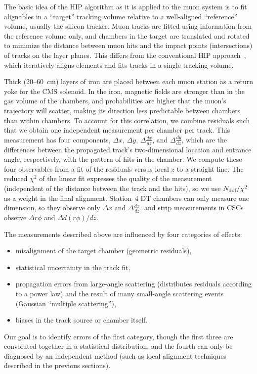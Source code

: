 The basic idea of the HIP algorithm as it is applied to the muon
system is to fit alignables in a ``target'' tracking volume relative to a
well-aligned ``reference'' volume, usually the silicon tracker.  Muon
tracks are fitted using information from the reference volume only,
and chambers in the target are translated and rotated to minimize the
distance between muon hits and the impact points (intersections) of
tracks on the layer planes.  This differs from the conventional HIP
approach~\cite{ref:oldhip}, which iteratively aligns elements and fits tracks
in a single tracking volume.

Thick (20--60~cm) layers of iron are placed between each muon station
as a return yoke for the CMS solenoid.  In the iron, magnetic fields
are stronger than in the gas volume of the chambers, and probabilities
are higher that the muon's trajectory will 
scatter, making its direction less predictable between chambers than
within chambers.  To account for this correlation, we combine
residuals such that we obtain one independent measurement per chamber
per track.  This measurement has four components,
$\Delta x$, $\Delta y$, $\Delta \frac{dx}{dz}$, and $\Delta
\frac{dy}{dz}$, which are the differences between the propagated track's two-dimensional
location and entrance angle, respectively, with the pattern of hits in
the chamber.  We compute these four observables from a fit of the
residuals versus local $z$ to a straight line.
The reduced $\chi^2$ of the linear fit expresses
the quality of the measurement (independent of the distance between
the track and the hits), so we use $N_{\mbox{\scriptsize dof}}/\chi^2$
as a weight in the final alignment.  Station~4 DT chambers can only
measure one dimension, so they observe only $\Delta x$ and
$\Delta \frac{dx}{dz}$, and strip measurements in CSCs observe $\Delta
r\phi$ and $\Delta d(r\phi)/dz$.

The measurements described above are influenced by four categories of effects:
\begin{itemize}
\item misalignment of the target chamber (geometric residuals),
\item statistical uncertainty in the track fit,
\item propagation errors from large-angle scattering (distributes
residuals according to a power law) and the result of many small-angle
scattering events (Gaussian ``multiple scattering''),
\item biases in the track source or chamber itself.
\end{itemize}
Our goal is to identify errors of the first category, though the first
three are convoluted together in a statistical distribution, and the
fourth can only be diagnosed by an independent method (such as local
alignment techniques described in the previous sections).

